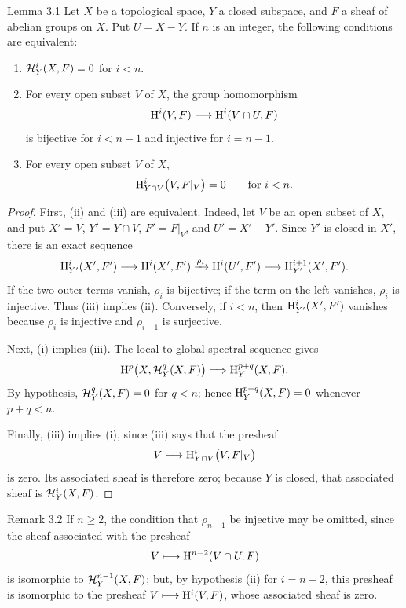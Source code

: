 \begin{sgastatement}{Lemma 3.1}
Let $X$ be a topological space, $Y$ a closed subspace, and $F$ a sheaf of
abelian groups on $X$. Put $U=X-Y$. If $n$ is an integer, the following
conditions are equivalent:
\begin{enumerate}[label=\textup{(\roman*)},leftmargin=2.6em]
\item $\mathcal H_Y^i(X,F)=0$ for $i<n$.
\item For every open subset $V$ of $X$, the group homomorphism
\[
  \mathrm H^i(V,F)\longrightarrow\mathrm H^i(V\cap U,F)
\]
is bijective for $i<n-1$ and injective for $i=n-1$.
\item For every open subset $V$ of $X$,
\[
  \mathrm H_{Y\cap V}^i\bigl(V,F|_V\bigr)=0\qquad\text{for }i<n.
\]
\end{enumerate}
\end{sgastatement}

\begin{proof}
First, (ii) and (iii) are equivalent. Indeed, let $V$ be an open subset of
$X$, and put $X'=V$, $Y'=Y\cap V$, $F'=F|_V$, and $U'=X'-Y'$. Since $Y'$ is
closed in $X'$, there is an exact sequence
\[
  \mathrm H_{Y'}^i(X',F')\longrightarrow \mathrm H^i(X',F')
  \xrightarrow{\rho_i}\mathrm H^i(U',F')
  \longrightarrow\mathrm H_{Y'}^{i+1}(X',F').
\]
If the two outer terms vanish, $\rho_i$ is bijective; if the term on the left
vanishes, $\rho_i$ is injective. Thus (iii) implies (ii). Conversely, if
$i<n$, then $\mathrm H_{Y'}^i(X',F')$ vanishes because $\rho_i$ is injective and
$\rho_{i-1}$ is surjective.

Next, (i) implies (iii). The local-to-global spectral sequence gives
\[
  \mathrm H^p\bigl(X,\mathcal H_Y^q(X,F)\bigr)\Longrightarrow
  \mathrm H_Y^{p+q}(X,F).
\]
By hypothesis, $\mathcal H_Y^q(X,F)=0$ for $q<n$; hence
$\mathrm H_Y^{p+q}(X,F)=0$ whenever $p+q<n$.

Finally, (iii) implies (i), since (iii) says that the presheaf
\[
  V\longmapsto\mathrm H_{Y\cap V}^i\bigl(V,F|_V\bigr)
\]
is zero. Its associated sheaf is therefore zero; because $Y$ is closed, that
associated sheaf is $\mathcal H_Y^i(X,F)$.
\end{proof}



\begin{sgastatement}{Remark 3.2}
If $n\ge2$, the condition that $\rho_{n-1}$ be injective may be omitted,
since the sheaf associated with the presheaf
\[
  V\longmapsto\mathrm H^{n-2}(V\cap U,F)
\]
is isomorphic to $\mathcal H_Y^{n-1}(X,F)$; but, by hypothesis (ii) for $i=n-2$,
this presheaf is isomorphic to the presheaf $V\longmapsto\mathrm H^i(V,F)$,
whose associated sheaf is zero.
\end{sgastatement}

